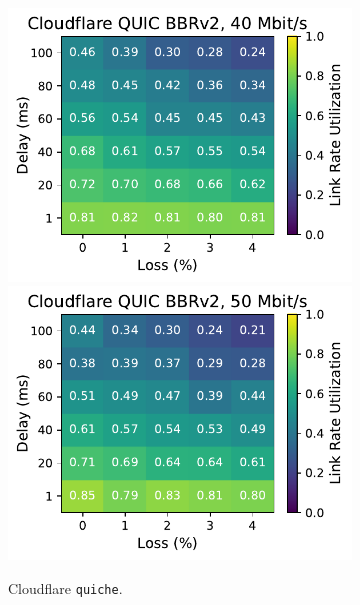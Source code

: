 \begin{figure}[ht]
\begin{subfigure}[b]{0.22\linewidth}
        \includegraphics[width=\linewidth,trim={0 0 2cm 0},clip]{splitting-paper/figures/heatmaps/heatmap_quiche_bbr2_40mbps.pdf}
        \includegraphics[width=\linewidth,trim={0 0 2cm 0},clip]{splitting-paper/figures/heatmaps/heatmap_quiche_bbr2_50mbps.pdf}
        \caption{Cloudflare \texttt{quiche}.}
    \end{subfigure}
    \begin{subfigure}[b]{0.89cm}

\end{subfigure}
\end{figure}
